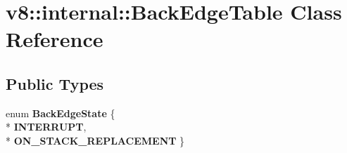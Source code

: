 \hypertarget{classv8_1_1internal_1_1_back_edge_table}{}\section{v8\+:\+:internal\+:\+:Back\+Edge\+Table Class Reference}
\label{classv8_1_1internal_1_1_back_edge_table}
\subsection*{Public Types}
\begin{DoxyCompactItemize}
\item 
enum {\bfseries Back\+Edge\+State} \{ \\*
{\bfseries I\+N\+T\+E\+R\+R\+U\+PT}, 
\\*
{\bfseries O\+N\+\_\+\+S\+T\+A\+C\+K\+\_\+\+R\+E\+P\+L\+A\+C\+E\+M\+E\+NT}
 \}\hypertarget{classv8_1_1internal_1_1_back_edge_table_a5fdd294b989ae7d9c3c08deecd60efa2}{}\label{classv8_1_1internal_1_1_back_edge_table_a5fdd294b989ae7d9c3c08deecd60efa2}

\end{DoxyCompactItemize}
